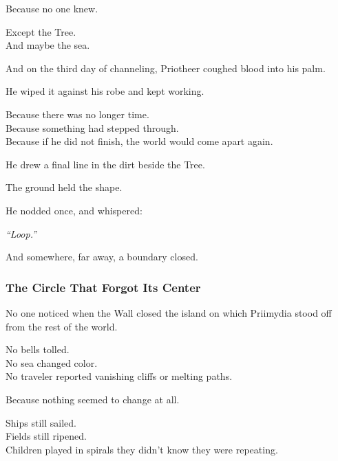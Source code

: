 \documentclass[12pt]{article}
\begin{document}
\vspace{0.5em}
Because no one knew.

\vspace{0.5em}
Except the Tree.\\
And maybe the sea.

\vspace{0.5em}
And on the third day of channeling, Priotheer coughed blood into his palm.

\vspace{0.5em}
He wiped it against his robe and kept working.

\vspace{0.5em}
Because there was no longer time.\\
Because something had stepped through.\\
Because if he did not finish, the world would come apart again.

\vspace{0.5em}
He drew a final line in the dirt beside the Tree.

\vspace{0.5em}
The ground held the shape.

\vspace{0.5em}
He nodded once, and whispered:

\vspace{0.5em}
\textit{``Loop.''}

\vspace{0.5em}
And somewhere, far away, a boundary closed.

\dotfill

\subsubsection{The Circle That Forgot Its Center}

No one noticed when the Wall closed the island on which Priimydia stood off from the rest of the world.

\vspace{0.5em}
No bells tolled.\\
No sea changed color.\\
No traveler reported vanishing cliffs or melting paths.

\vspace{0.5em}
Because nothing seemed to change at all.

\vspace{0.5em}
Ships still sailed.\\
Fields still ripened.\\
Children played in spirals they didn’t know they were repeating.
\end{document}
